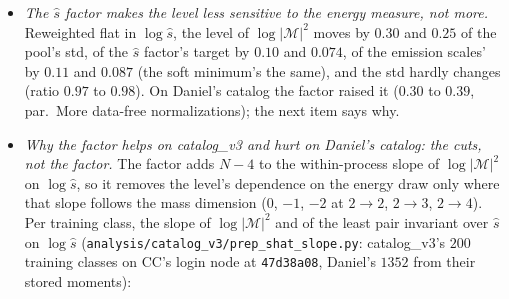 \documentclass[11pt]{article}
\newcommand{\code}[1]{\texttt{#1}}
\begin{document}
\begin{itemize}
  \item \emph{The $\hat s$ factor makes the level less sensitive to the energy measure, not more.} Reweighted flat in
    $\log\hat s$, the level of $\log|\mathcal M|^2$ moves by $0.30$ and $0.25$ of the pool's std, of the $\hat s$ factor's
    target by $0.10$ and $0.074$, of the emission scales' by $0.11$ and $0.087$ (the soft minimum's the same), and the
    std hardly changes (ratio $0.97$ to $0.98$). On Daniel's catalog the factor raised it ($0.30$ to $0.39$, par.\
    More data-free normalizations); the next item says why.
  \item \emph{Why the factor helps on catalog\_v3 and hurt on Daniel's catalog: the cuts, not the factor.} The factor
    adds $N-4$ to the within-process slope of $\log|\mathcal M|^2$ on $\log\hat s$, so it removes the level's
    dependence on the energy draw only where that slope follows the mass dimension ($0$, $-1$, $-2$ at $2\to2$, $2\to3$,
    $2\to4$). Per training class, the slope of $\log|\mathcal M|^2$ and of the least pair invariant over $\hat s$ on
    $\log\hat s$ (\code{analysis/catalog\_v3/prep\_shat\_slope.py}: catalog\_v3's $200$ training classes on CC's login
    node at \code{47d38a08}, Daniel's $1352$ from their stored moments):

\end{itemize}
\end{document}
